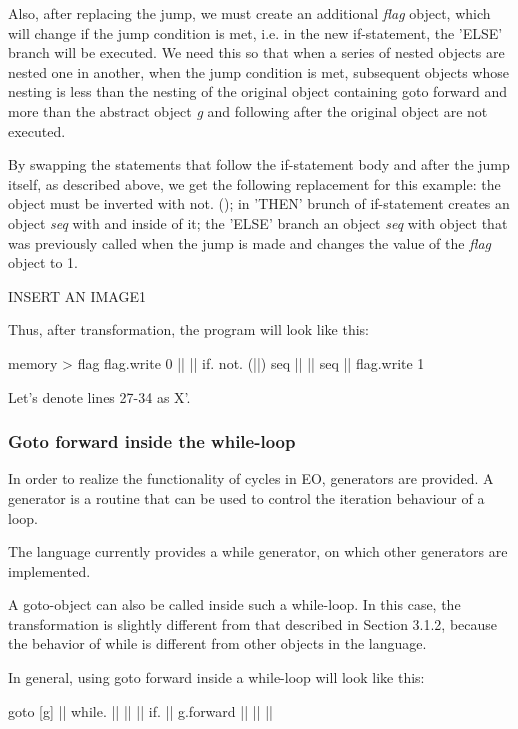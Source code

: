 \documentclass[sigplan,review,11pt,nonacm,natbib=false]{acmart}
\begin{document}
Also, after replacing the jump, we must create an additional \emph{flag} object, which will change if the jump condition is met, i.e. in the new if-statement, the 'ELSE' branch will be executed. We need this so that when a series of nested objects are nested one in another, when the jump condition is met, subsequent objects whose nesting is less than the nesting of the original object containing goto forward and more than the abstract object \emph{g} and following after the original object are not executed.

By swapping the statements that follow the if-statement body and after the jump itself, as described above, we get the following replacement for this example: the  object must be inverted with not. (); in 'THEN' brunch of if-statement creates an object \emph{seq} with  and  inside of it; the 'ELSE' branch an object \emph{seq} with  object that was previously called when the jump is made and changes the value of the \emph{flag} object to 1.

{INSERT AN IMAGE1}

Thus, after transformation, the program will look like this:
\begin{ffcode}
memory > flag
flag.write 0
||
  ||
    if.
      not. (||)
      seq
        ||
        ||
      seq
        ||
        flag.write 1
\end{ffcode}

Let's denote lines 27-34 as X'.


\subsubsection{Goto forward inside the while-loop}
In order to realize the functionality of cycles in EO, generators are provided. A generator is a routine that can be used to control the iteration behaviour of a loop.

The language currently provides a while generator, on which other generators are implemented.

A goto-object can also be called inside such a while-loop. In this case, the transformation is slightly different from that described in Section 3.1.2, because the behavior of while is different from other objects in the language.

In general, using goto forward inside a while-loop will look like this:
\begin{ffcode}
goto
  [g]
    ||
      while.
        ||
        ||
          ||
          if.
            ||
            g.forward ||
            ||
          ||
\end{ffcode}
\end{document}
